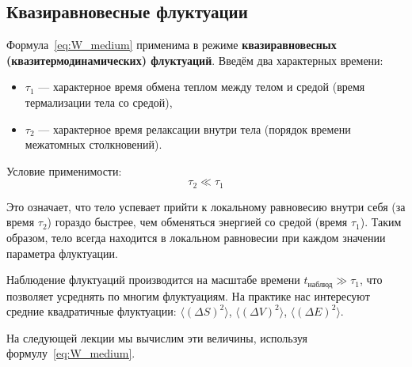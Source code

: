 \documentclass[../general/general]{subfiles}
\begin{document}
\subsection{Квазиравновесные флуктуации}

Формула~\eqref{eq:W_medium} применима в режиме \textbf{квазиравновесных (квазитермодинамических) флуктуаций}. Введём два характерных времени:
\begin{itemize}
    \item $\tau_1$ --- характерное время обмена теплом между телом и средой (время термализации тела со средой),
    \item $\tau_2$ --- характерное время релаксации внутри тела (порядок времени межатомных столкновений).
\end{itemize}

Условие применимости:
\begin{equation}
    \tau_2 \ll \tau_1
\end{equation}

Это означает, что тело успевает прийти к локальному равновесию внутри себя (за время $\tau_2$) гораздо быстрее, чем обменяться энергией со средой (время $\tau_1$). Таким образом, тело всегда находится в локальном равновесии при каждом значении параметра флуктуации.

Наблюдение флуктуаций производится на масштабе времени $t_{\text{наблюд}} \gg \tau_1$, что позволяет усреднять по многим флуктуациям. На практике нас интересуют средние квадратичные флуктуации: $\langle(\Delta S)^2\rangle$, $\langle(\Delta V)^2\rangle$, $\langle(\Delta E)^2\rangle$.

На следующей лекции мы вычислим эти величины, используя формулу~\eqref{eq:W_medium}.

\end{document}

